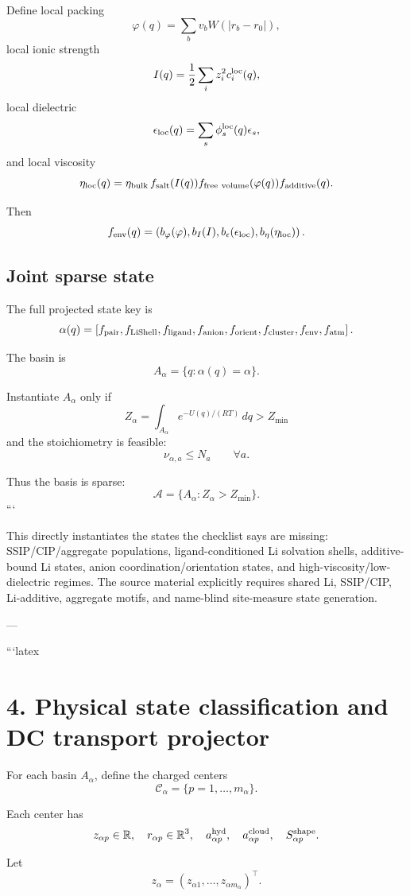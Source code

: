 Define local packing
\[
\varphi(q)=\sum_b v_b W(|r_b-r_0|),
\]
local ionic strength
\[
I(q)=\frac12\sum_i z_i^2 c_i^{\rm loc}(q),
\]
local dielectric
\[
\epsilon_{\rm loc}(q)=\sum_s \phi_s^{\rm loc}(q)\epsilon_s,
\]
and local viscosity
\[
\eta_{\rm loc}(q)=\eta_{\rm bulk}\,
f_{\rm salt}(I(q))f_{\rm free\ volume}(\varphi(q))f_{\rm additive}(q).
\]

Then
\[
f_{\rm env}(q)=
\left(
b_\varphi(\varphi),
b_I(I),
b_\epsilon(\epsilon_{\rm loc}),
b_\eta(\eta_{\rm loc})
\right).
\]

\subsection{Joint sparse state}

The full projected state key is
\[
\alpha(q)=
\left[
f_{\rm pair},
f_{\rm LiShell},
f_{\rm ligand},
f_{\rm anion},
f_{\rm orient},
f_{\rm cluster},
f_{\rm env},
f_{\rm atm}
\right].
\]

The basin is
\[
A_\alpha=\{q:\alpha(q)=\alpha\}.
\]

Instantiate \(A_\alpha\) only if
\[
Z_\alpha=
\int_{A_\alpha}e^{-U(q)/(RT)}\,dq>Z_{\min}
\]
and the stoichiometry is feasible:
\[
\nu_{\alpha,a}\le N_a
\qquad
\forall a.
\]

Thus the basis is sparse:
\[
\mathcal A=\{A_\alpha:Z_\alpha>Z_{\min}\}.
\]
```

This directly instantiates the states the checklist says are missing: SSIP/CIP/aggregate populations, ligand-conditioned Li solvation shells, additive-bound Li states, anion coordination/orientation states, and high-viscosity/low-dielectric regimes. The source material explicitly requires shared Li, SSIP/CIP, Li-additive, aggregate motifs, and name-blind site-measure state generation. 

---

```latex
\section{4. Physical state classification and DC transport projector}

For each basin \(A_\alpha\), define the charged centers
\[
\mathcal C_\alpha=\{p=1,\ldots,m_\alpha\}.
\]

Each center has
\[
z_{\alpha p}\in\mathbb R,
\quad
r_{\alpha p}\in\mathbb R^3,
\quad
a_{\alpha p}^{\rm hyd},
\quad
a_{\alpha p}^{\rm cloud},
\quad
S_{\alpha p}^{\rm shape}.
\]

Let
\[
z_\alpha=(z_{\alpha1},\ldots,z_{\alpha m_\alpha})^\top.
\]

